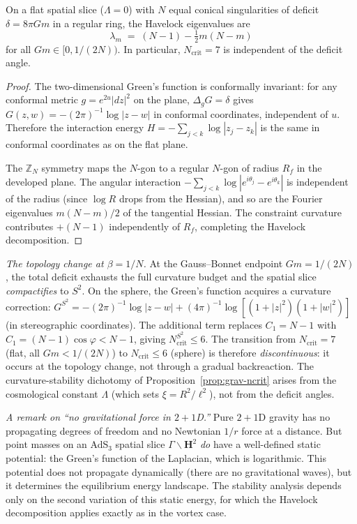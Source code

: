 \begin{proposition}
\label{prop:conformal-invariance}
On a flat spatial slice ($\Lambda = 0$) with $N$ equal conical
singularities of deficit $\delta = 8\pi Gm$ in a regular ring,
the Havelock eigenvalues are
\[
  \lambda_m \;=\; (N{-}1) - \tfrac{1}{2}m(N{-}m)
\]
for all $Gm \in [0, 1/(2N))$.
In particular, $N_{\mathrm{crit}} = 7$ is independent of the
deficit angle.
\end{proposition}

\begin{proof}
The two-dimensional Green's function is conformally invariant:
for any conformal metric $g = e^{2u}|dz|^2$ on the plane,
$\Delta_g G = \delta$ gives
$G(z,w) = -(2\pi)^{-1}\log|z{-}w|$
in conformal coordinates, independent of $u$.
Therefore the interaction energy
$H = -\sum_{j<k}\log|z_j - z_k|$ is the same in conformal
coordinates as on the flat plane.

The $\mathbb{Z}_N$ symmetry maps the $N$-gon to a regular
$N$-gon of radius $R_f$ in the developed plane.
The angular interaction
$-\sum_{j<k}\log|e^{i\theta_j} - e^{i\theta_k}|$
is independent of the radius (since $\log R$ drops from the
Hessian), and so are the Fourier eigenvalues
$m(N{-}m)/2$ of the tangential Hessian.
The constraint curvature contributes $+(N{-}1)$
independently of $R_f$, completing the
Havelock decomposition.
\end{proof}

\emph{The topology change at $\beta = 1/N$.}
At the Gauss--Bonnet endpoint $Gm = 1/(2N)$, the total deficit
exhausts the full curvature budget and the spatial slice
\emph{compactifies} to $S^2$.
On the sphere, the Green's function acquires a
curvature correction:
$G^{S^2} = -(2\pi)^{-1}\log|z{-}w|
+ (4\pi)^{-1}\log[(1{+}|z|^2)(1{+}|w|^2)]$
(in stereographic coordinates).
The additional term replaces $C_1 = N{-}1$ with
$C_1 = (N{-}1)\cos\varphi < N{-}1$, giving
$N_{\mathrm{crit}}^{S^2} \le 6$.
The transition from $N_{\mathrm{crit}} = 7$ (flat, all
$Gm < 1/(2N)$) to $N_{\mathrm{crit}} \le 6$ (sphere) is
therefore \emph{discontinuous}: it occurs at the topology
change, not through a gradual backreaction.
The curvature-stability dichotomy of
Proposition~\ref{prop:grav-ncrit} arises from the cosmological
constant $\Lambda$ (which sets $\xi = R^2/\ell^2$), not from
the deficit angles.

\emph{A remark on ``no gravitational force in $2{+}1$D.''}
Pure $2{+}1$D gravity has no propagating degrees of freedom
and no Newtonian $1/r$ force at a distance.
But point masses on an AdS$_3$ spatial slice
$\Gamma\backslash\mathbf{H}^2$ \emph{do} have a
well-defined static potential: the Green's function of the
Laplacian, which is logarithmic.
This potential does not propagate dynamically (there are no
gravitational waves), but it determines the equilibrium
energy landscape.
The stability analysis depends only on the second variation
of this static energy, for which the Havelock decomposition
applies exactly as in the vortex case.

